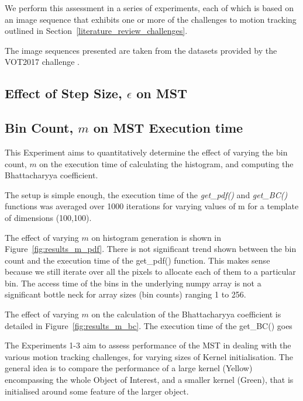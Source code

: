 We perform this assessment in a series of experiments, each of which is based on an image
sequence that exhibits one or more of the challenges to motion tracking outlined
in Section~\ref{literature_review_challenges}. 
 
The image sequences presented are taken from the datasets provided by the VOT2017
challenge \cite{VOT_TPAMI}.


\subsection{Effect of Step Size, $\epsilon$ on MST}\label{results_eps}


\subsection{Bin Count, $m$ on MST Execution time}\label{results_m}
This Experiment aims to quantitatively determine the effect of varying the
bin count, $m$ on the execution time of calculating the histogram, and computing
the Bhattacharyya coefficient.

The setup is simple enough, the execution time of the \textit{get\_pdf()} and
\textit{get\_BC()} functions was averaged over 1000 iterations for varying
values of m for a template of dimensions (100,100).

The effect of varying $m$ on histogram generation is shown in
Figure~\ref{fig:results_m_pdf}. There is not significant trend shown between the
bin count and the execution time of the get\_pdf() function. This makes sense
because we still iterate over all the pixels to allocate each of them to a
particular bin. The access time of the bins in the underlying numpy array is not
a significant bottle neck for array sizes (bin counts) ranging 1 to 256.

The effect of varying $m$ on the calculation of the Bhattacharyya coefficient is
detailed in Figure~\ref{fig:results_m_bc}. The execution time of the get\_BC() goes  



The Experiments 1-3 aim to assess performance of the MST in dealing with the
various motion tracking challenges, for varying sizes of Kernel initialisation.
The general idea is to compare the performance of a large kernel (Yellow)
encompassing the whole Object of Interest, and a smaller kernel (Green), that is
initialised around some feature of the larger object. 

